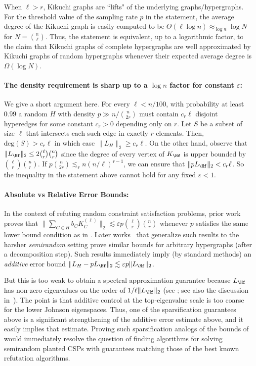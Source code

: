 \documentclass
[11pt,letterpaper]
{article}
\renewcommand*{\deg}{\mathrm{deg}}
\renewcommand{\epsilon}{\varepsilon}
\begin{document}
When $\ell > r$, Kikuchi graphs are ``lifts" of the underlying graphs/hypergraphs. 
For the threshold value of the sampling rate $p$ in the statement, the average degree of the Kikuchi graph is easily computed to be $\Theta(\ell \log n) \approx_{\log n} \log N$ for $N = {n \choose \ell}$. Thus, the statement is equivalent, up to a logarithmic factor, to the claim that Kikuchi graphs of complete hypergraphs are well approximated by Kikuchi graphs of random hypergraphs whenever their expected average degree is $\Omega(\log N)$. 


\paragraph{The density requirement is sharp up to a $\log n$ factor for constant $\epsilon$:} We give a short argument here. For every $\ell < n/100$, with probability at least $0.99$ a random $H$ with density $p \gg n/{n \choose 2r}$ must contain $c_r \ell$ disjoint hyperedges for some constant $c_r>0$ depending only on $r$. Let $S$ be a subset of size $\ell$ that intersects each such edge in exactly $r$ elements. Then, $\deg(S) > c_r \ell$ in which case $\|L_H\|_2 \geq c_r \ell$. On the other hand, observe that $\|L_{\Hf}\|_2 \leq 2{\ell \choose r} {n \choose r}$ since the degree of every vertex of $K_{\Hf}$ is upper bounded by ${\ell \choose r} {n \choose r}$. If $p {n \choose 2r} \lesssim_{r} n (n/\ell)^{r-1}$, we can ensure that $\|p L_{\Hf}\|_2 < c_r \ell$. So the inequality in the statement above cannot hold for any fixed $\epsilon<1$. 

\paragraph{Absolute vs Relative Error Bounds:} 
In the context of refuting random constraint satisfaction problems, prior work~\cite{WeinAM19,Hastings20TensorPCA} proves that $\|\sum_{C \in H} b_C K_C^{(\ell)}\|_2 \lesssim \epsilon p {\ell \choose r}{n \choose r}$ whenever $p$ satisfies the same lower bound condition as in . Later works~\cite{GuruswamiKM22,HsiehKM23}  that generalize such results to the harsher \emph{semirandom} setting prove similar bounds for arbitrary hypergraphs (after a decomposition step). Such results immediately imply (by standard methods) an \emph{additive} error bound $\|L_H - p L_{\Hf}\|_2 \lesssim \epsilon p \|L_{\Hf}\|_2$. 

But this is too weak to obtain a spectral approximation guarantee because $L_{\Hf}$ has non-zero eigenvalues on the order of $1/\ell \|L_{\Hf}\|_2$ (see ; see also the discussion in~\cite{GHKM23}). The point is that additive control at the top-eigenvalue scale is too coarse for the lower Johnson eigenspaces. Thus, one of the sparsification guarantees above is a significant strengthening of the additive error estimate above, and it easily implies that estimate. Proving such sparsification analogs of the bounds of~\cite{GuruswamiKM22,HsiehKM23} would immediately resolve the question of finding algorithms for solving semirandom planted CSPs with guarantees matching those of the best known refutation algorithms. 
\end{document}
